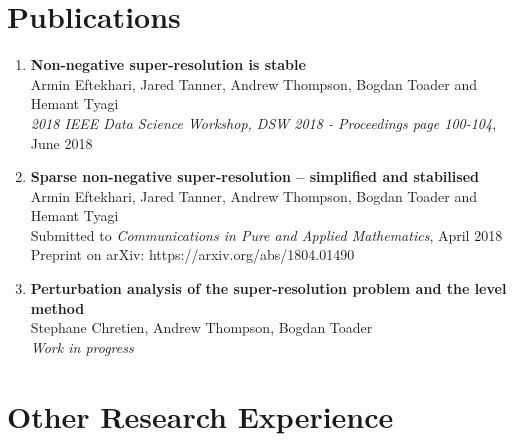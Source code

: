 \documentclass[11pt,a4paper,roman]{moderncv} %
\begin{document}
\section{Publications}


\begin{enumerate}

  \item
\textbf{Non-negative super-resolution is stable} \\
Armin Eftekhari, Jared Tanner, Andrew Thompson, Bogdan Toader and Hemant Tyagi\\
{\em 2018 IEEE Data Science Workshop, DSW 2018 - Proceedings page 100-104},
June 2018 
\vspace{0.7em}
  
  \item
\textbf{Sparse non-negative super-resolution -- simplified and stabilised} \\
Armin Eftekhari, Jared Tanner, Andrew Thompson, Bogdan Toader and Hemant Tyagi\\
Submitted to {\em Communications in Pure and Applied Mathematics},
April 2018 \\
Preprint on arXiv: https://arxiv.org/abs/1804.01490
\vspace{0.7em}

  \item
\textbf{Perturbation analysis of the super-resolution problem and the level method}\\
Stephane Chretien, Andrew Thompson, Bogdan Toader\\
{\em Work in progress}
\vspace{0.7em}

\end{enumerate}





        


\section{Other Research Experience}
\end{document}
